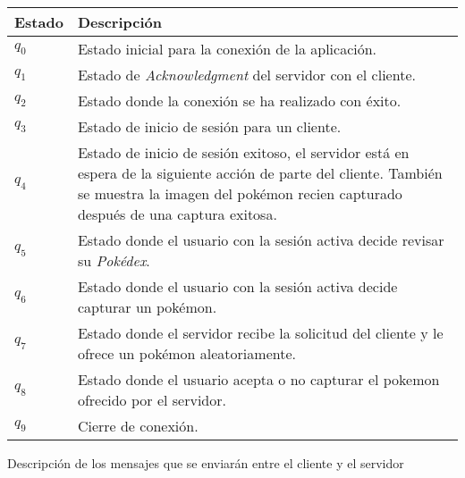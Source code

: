 \documentclass[12pt]{article}
\begin{document}
\begin{center}
\begin{tabular}{|l|p{9cm}|}
  \hline
  Estado & Descripción \\
  \hline
  $q_0$ & Estado inicial para la conexión de la aplicación. \\ \hline
  $q_1$ & Estado de \textit{Acknowledgment} del servidor con el cliente. \\ \hline
  $q_2$ & Estado donde la conexión se ha realizado con éxito. \\ \hline
  $q_3$ & Estado de inicio de sesión para un cliente. \\ \hline
  $q_4$ & Estado de inicio de sesión exitoso, el servidor está en espera de la siguiente acción de parte del cliente. También se muestra la imagen del pokémon recien capturado después de una captura exitosa. \\ \hline
  $q_5$ & Estado donde el usuario con la sesión activa decide revisar su \textit{Pokédex}. \\ \hline
  $q_6$ & Estado donde el usuario con la sesión activa decide capturar un pokémon.\\ \hline
  $q_7$ & Estado donde el servidor recibe la solicitud del cliente y le ofrece un pokémon aleatoriamente.\\ \hline
  $q_8$ & Estado donde el usuario acepta o no capturar el pokemon ofrecido por el servidor.\\ \hline
  $q_9$ & Cierre de conexión. \\
  \hline
\end{tabular}
\end{center}
\newpage

Descripción de los mensajes que se enviarán entre el cliente y el servidor
\end{document}
